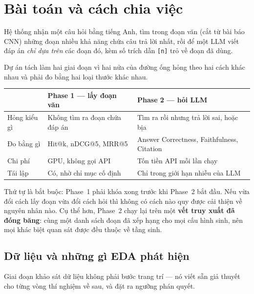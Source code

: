 \section{Bài toán và cách chia việc}

Hệ thống nhận một câu hỏi bằng tiếng Anh, tìm trong \NumCorpusChunks{} đoạn văn
(cắt từ \NumCorpusArticles{} bài báo CNN) những đoạn nhiều khả năng chứa câu trả
lời nhất, rồi để một LLM viết đáp án \emph{chỉ dựa trên} các đoạn đó, kèm số
trích dẫn \texttt{[n]} trỏ về đoạn đã dùng.

Dự án tách làm hai giai đoạn vì hai nửa của đường ống hỏng theo hai cách khác
nhau và phải đo bằng hai loại thước khác nhau.

\begin{center}\small
\begin{tabularx}{0.94\textwidth}{@{}p{2.8cm} L L@{}}
\toprule
 & \textbf{Phase 1 --- lấy đoạn văn} & \textbf{Phase 2 --- hỏi LLM} \\
\midrule
Hỏng kiểu gì & Không tìm ra đoạn chứa đáp án & Tìm ra rồi nhưng trả lời sai, hoặc bịa \\
Đo bằng gì & Hit@k, nDCG@5, MRR@5 & Answer Correctness, Faithfulness, Citation \\
Chi phí & GPU, không gọi API & Tốn tiền API mỗi lần chạy \\
Tái lập & Có, nhờ chỉ mục cố định & Chỉ trong giới hạn nhiễu của LLM \\
\bottomrule
\end{tabularx}
\end{center}

Thứ tự là bắt buộc: Phase~1 phải khóa xong trước khi Phase~2 bắt đầu. Nếu vừa
đổi cách lấy đoạn vừa đổi cách hỏi thì không có cách nào quy được cải thiện về
nguyên nhân nào. Cụ thể hơn, Phase~2 chạy lại trên một \textbf{vết truy xuất đã
đóng băng}: cùng một danh sách đoạn đã xếp hạng cho mọi cấu hình sinh, nên mọi
khác biệt quan sát được đều thuộc về tầng sinh.

\subsection{Dữ liệu và những gì EDA phát hiện}

Giai đoạn khảo sát dữ liệu không phải bước trang trí --- nó viết sẵn giả thuyết
cho từng vòng thí nghiệm về sau, và đặt ra ngưỡng phán quyết.

